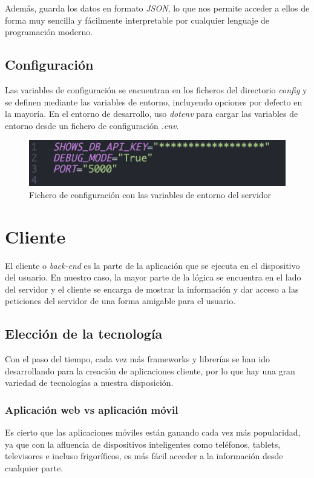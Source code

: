 Además, guarda los datos en formato \textit{JSON}\cite{json}, lo que nos permite acceder a ellos de forma muy sencilla y
fácilmente interpretable por cualquier lenguaje de programación moderno.

\subsection{Configuración}

Las variables de configuración se encuentran en los ficheros del directorio \textit{config} y se definen mediante las
variables de entorno, incluyendo opciones por defecto en la mayoría. En el entorno de desarrollo, uso \textit{dotenv}
para cargar las variables de entorno desde un fichero de configuración \textit{.env}.
\begin{figure}[H]
\centering	
    \includegraphics[scale=0.525]{img/dotenv.png}
\caption{ Fichero de configuración con las variables de entorno del servidor }\label{fig:dotenv}
\end{figure}

\section{Cliente}
El cliente o \textit{back-end} es la parte de la aplicación que se ejecuta en el dispositivo del usuario. En nuestro
caso, la mayor parte de la lógica se encuentra en el lado del servidor y el cliente se encarga de mostrar la información
y dar acceso a las peticiones del servidor de una forma amigable para el usuario.\\

\subsection{Elección de la tecnología}
Con el paso del tiempo, cada vez más frameworks y librerías se han ido desarrollando para la creación de aplicaciones
cliente, por lo que hay una gran variedad de tecnologías a nuestra disposición.\\

\subsubsection{Aplicación web vs aplicación móvil}
Es cierto que las aplicaciones móviles están ganando cada vez más popularidad, ya que con la afluencia de dispositivos
inteligentes como teléfonos, tablets, televisores e incluso frigoríficos, es más fácil acceder a la información desde
cualquier parte.\\

